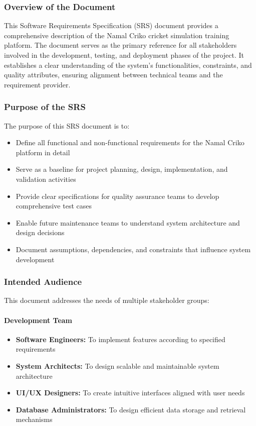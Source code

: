 \documentclass[12pt,a4paper]{article}
\begin{document}
\subsubsection{Overview of the Document}
This Software Requirements Specification (SRS) document provides a comprehensive description of the Namal Criko cricket simulation training platform. The document serves as the primary reference for all stakeholders involved in the development, testing, and deployment phases of the project. It establishes a clear understanding of the system's functionalities, constraints, and quality attributes, ensuring alignment between technical teams and the requirement provider.

\subsubsection{Purpose of the SRS}
The purpose of this SRS document is to:
\begin{itemize}
    \item Define all functional and non-functional requirements for the Namal Criko platform in detail
    \item Serve as a baseline for project planning, design, implementation, and validation activities
    \item Provide clear specifications for quality assurance teams to develop comprehensive test cases
    \item Enable future maintenance teams to understand system architecture and design decisions
    \item Document assumptions, dependencies, and constraints that influence system development
\end{itemize}

\subsubsection{Intended Audience}
This document addresses the needs of multiple stakeholder groups:

\paragraph{Development Team}
\begin{itemize}
    \item \textbf{Software Engineers:} To implement features according to specified requirements
    \item \textbf{System Architects:} To design scalable and maintainable system architecture
    \item \textbf{UI/UX Designers:} To create intuitive interfaces aligned with user needs
    \item \textbf{Database Administrators:} To design efficient data storage and retrieval mechanisms
\end{itemize}
\end{document}
